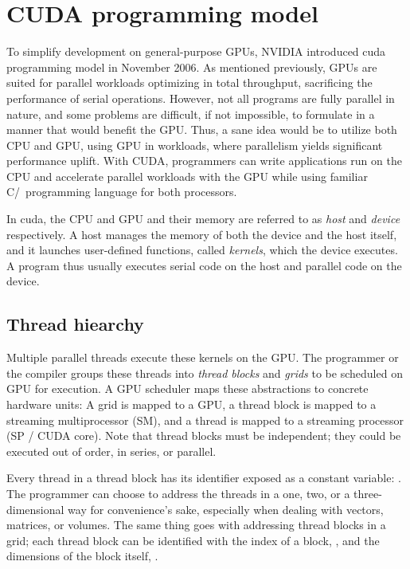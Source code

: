 \section{CUDA programming model} \label{label:cuda}

To simplify development on general-purpose GPUs, NVIDIA introduced \acrfull{cuda} programming model in November 2006. As mentioned previously, GPUs are suited for parallel workloads optimizing in total throughput, sacrificing the performance of serial operations. However, not all programs are fully parallel in nature, and some problems are difficult, if not impossible, to formulate in a manner that would benefit the GPU. Thus, a sane idea would be to utilize both CPU and GPU, using GPU in workloads, where parallelism yields significant performance uplift. With CUDA, programmers can write applications run on the CPU and accelerate parallel workloads with the GPU while using familiar C/\CC\ programming language for both processors.

In \acrshort{cuda}, the CPU and GPU and their memory are referred to as \textit{host} and \textit{device} respectively. A host manages the memory of both the device and the host itself, and it launches user-defined functions, called \textit{kernels}, which the device executes. A program thus usually executes serial code on the host and parallel code on the device.

\subsection{Thread hiearchy}

Multiple parallel threads execute these kernels on the GPU. The programmer or the compiler groups these threads into \textit{thread blocks} and \textit{grids} to be scheduled on GPU for execution. A GPU scheduler maps these abstractions to concrete hardware units: A grid is mapped to a GPU, a thread block is mapped to a streaming multiprocessor (SM), and a thread is mapped to a streaming processor (SP / CUDA core). Note that thread blocks must be independent; they could be executed out of order, in series, or parallel.

Every thread in a thread block has its identifier exposed as a constant variable: . The programmer can choose to address the threads in a one, two, or a three-dimensional way for convenience's sake, especially when dealing with vectors, matrices, or volumes. The same thing goes with addressing thread blocks in a grid; each thread block can be identified with the index of a block, , and the dimensions of the block itself, .

